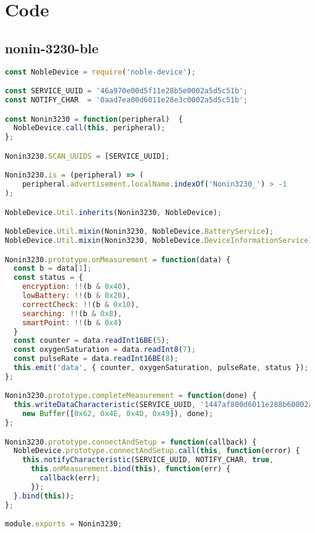
\chapter{Code}

\section{nonin-3230-ble}
\begin{lstlisting}[frame=single, language=JavaScript,
    caption=Nonin 3230 noble-device library, label=lst:nonin-3230-library]
const NobleDevice = require('noble-device');

const SERVICE_UUID = '46a970e00d5f11e28b5e0002a5d5c51b';
const NOTIFY_CHAR  = '0aad7ea00d6011e28e3c0002a5d5c51b';

const Nonin3230 = function(peripheral)  {
  NobleDevice.call(this, peripheral);
};

Nonin3230.SCAN_UUIDS = [SERVICE_UUID];

Nonin3230.is = (peripheral) => (
    peripheral.advertisement.localName.indexOf('Nonin3230_') > -1
);

NobleDevice.Util.inherits(Nonin3230, NobleDevice);

NobleDevice.Util.mixin(Nonin3230, NobleDevice.BatteryService);
NobleDevice.Util.mixin(Nonin3230, NobleDevice.DeviceInformationService);

Nonin3230.prototype.onMeasurement = function(data) {
  const b = data[1];
  const status = {
    encryption: !!(b & 0x40),
    lowBattery: !!(b & 0x20),
    correctCheck: !!(b & 0x10),
    searching: !!(b & 0x8),
    smartPoint: !!(b & 0x4)
  }
  const counter = data.readInt16BE(5);
  const oxygenSaturation = data.readInt8(7);
  const pulseRate = data.readInt16BE(8);
  this.emit('data', { counter, oxygenSaturation, pulseRate, status });
};

Nonin3230.prototype.completeMeasurement = function(done) {
  this.writeDataCharacteristic(SERVICE_UUID, '1447af800d6011e288b60002a5d5c51b',
    new Buffer([0x62, 0x4E, 0x4D, 0x49]), done);
};

Nonin3230.prototype.connectAndSetup = function(callback) {
  NobleDevice.prototype.connectAndSetup.call(this, function(error) {
    this.notifyCharacteristic(SERVICE_UUID, NOTIFY_CHAR, true,
      this.onMeasurement.bind(this), function(err) {
        callback(err);
      });
  }.bind(this));
};

module.exports = Nonin3230;

\end{lstlisting}